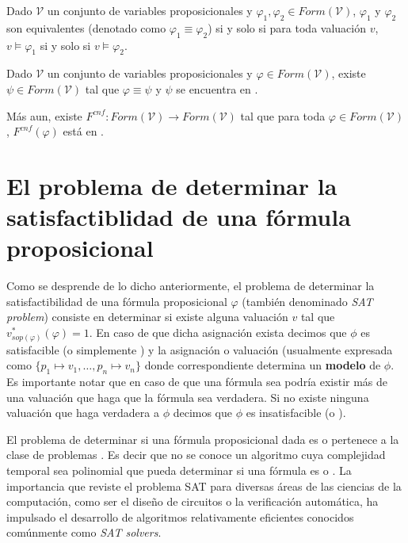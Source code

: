 \begin{definition}
Dado $\mathcal{V}$ un conjunto de variables proposicionales y $\varphi_1, \varphi_2 \in \mathit{Form}(\mathcal{V})$, $\varphi_1$ y $\varphi_2$ son equivalentes (denotado como $\varphi_1 \equiv \varphi_2$) si y solo si para toda valuación $v$, $v \models \varphi_1$ si y solo si $v \models \varphi_2$.
\end{definition}

\begin{remark}\label{obs:cnfequiv}
Dado $\mathcal{V}$ un conjunto de variables proposicionales y $\varphi \in \mathit{Form}(\mathcal{V})$, existe $\psi \in \mathit{Form}(\mathcal{V})$ tal que $\varphi \equiv \psi$ y $\psi$ se encuentra en \cnf.

Más aun, existe $F^{\mathit{cnf}}: \mathit{Form}(\mathcal{V}) \to \mathit{Form}(\mathcal{V})$ tal que para toda $\varphi \in \mathit{Form}(\mathcal{V})$, $F^{\mathit{cnf}} (\varphi)$ está en \cnf. \cite{tseitin83}
\end{remark}




\section{El problema de determinar la satisfactiblidad de una fórmula proposicional}

Como se desprende de lo dicho anteriormente, el problema de determinar la satisfactibilidad de una fórmula proposicional $\varphi$ (también denominado \emph{SAT problem}) consiste en determinar si existe alguna valuación $v$ tal que $v_{\mathit{sop}(\varphi)}^*(\varphi) = 1$. En caso de que dicha
asignación exista decimos que $\phi$ es satisfacible (o simplemente \sat) y la
asignación o valuación (usualmente expresada como $\{ p_1 \mapsto v_1, \ldots, p_n \mapsto v_n \}$ donde 
correspondiente determina un \textbf{modelo} de $\phi$. Es importante notar que en caso
de que una fórmula sea \sat podría existir más de una valuación que haga que la
fórmula sea verdadera. Si no existe ninguna valuación que haga verdadera a
$\phi$ decimos que $\phi$ es insatisfacible (o \unsat).

El problema de determinar si una fórmula proposicional dada es \sat o \unsat pertenece
a la clase de problemas \npc\cite{Cook:1971:CTP:800157.805047}. Es decir que no
se conoce un algoritmo cuya complejidad temporal sea polinomial que pueda determinar si una fórmula es \sat
o \unsat. La importancia que reviste el problema SAT para diversas áreas de las
ciencias de la computación, como ser el diseño de circuitos o la verificación
automática, ha impulsado el desarrollo de algoritmos relativamente eficientes
conocidos comúnmente como \emph{SAT solvers}.

